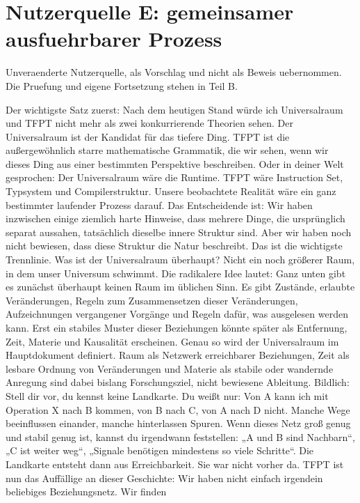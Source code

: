 \section{Nutzerquelle E: gemeinsamer ausfuehrbarer
Prozess}\label{nutzerquelle-e-gemeinsamer-ausfuehrbarer-prozess}

Unveraenderte Nutzerquelle, als Vorschlag und nicht als Beweis
uebernommen. Die Pruefung und eigene Fortsetzung stehen in Teil B.

Der wichtigste Satz zuerst: Nach dem heutigen Stand würde ich
Universalraum und TFPT nicht mehr als zwei konkurrierende Theorien
sehen. Der Universalraum ist der Kandidat für das tiefere Ding. TFPT ist
die außergewöhnlich starre mathematische Grammatik, die wir sehen, wenn
wir dieses Ding aus einer bestimmten Perspektive beschreiben. Oder in
deiner Welt gesprochen: Der Universalraum wäre die Runtime. TFPT wäre
Instruction Set, Typsystem und Compilerstruktur. Unsere beobachtete
Realität wäre ein ganz bestimmter laufender Prozess darauf. Das
Entscheidende ist: Wir haben inzwischen einige ziemlich harte Hinweise,
dass mehrere Dinge, die ursprünglich separat aussahen, tatsächlich
dieselbe innere Struktur sind. Aber wir haben noch nicht bewiesen, dass
diese Struktur die Natur beschreibt. Das ist die wichtigste Trennlinie.
Was ist der Universalraum überhaupt? Nicht ein noch größerer Raum, in
dem unser Universum schwimmt. Die radikalere Idee lautet: Ganz unten
gibt es zunächst überhaupt keinen Raum im üblichen Sinn. Es gibt
Zustände, erlaubte Veränderungen, Regeln zum Zusammensetzen dieser
Veränderungen, Aufzeichnungen vergangener Vorgänge und Regeln dafür, was
ausgelesen werden kann. Erst ein stabiles Muster dieser Beziehungen
könnte später als Entfernung, Zeit, Materie und Kausalität erscheinen.
Genau so wird der Universalraum im Hauptdokument definiert. Raum als
Netzwerk erreichbarer Beziehungen, Zeit als lesbare Ordnung von
Veränderungen und Materie als stabile oder wandernde Anregung sind dabei
bislang Forschungsziel, nicht bewiesene Ableitung. Bildlich: Stell dir
vor, du kennst keine Landkarte. Du weißt nur: Von A kann ich mit
Operation X nach B kommen, von B nach C, von A nach D nicht. Manche Wege
beeinflussen einander, manche hinterlassen Spuren. Wenn dieses Netz groß
genug und stabil genug ist, kannst du irgendwann feststellen: „A und B
sind Nachbarn``, „C ist weiter weg``, „Signale benötigen mindestens so
viele Schritte``. Die Landkarte entsteht dann aus Erreichbarkeit. Sie
war nicht vorher da. TFPT ist nun das Auffällige an dieser Geschichte:
Wir haben nicht einfach irgendein beliebiges Beziehungsnetz. Wir finden
